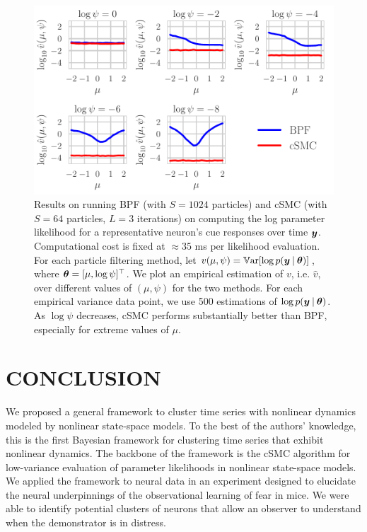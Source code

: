 \documentclass[twoside]{article}
\begin{document}
\begin{figure}[h!]
\begin{center}
\includegraphics[scale=0.5]{../img/bpf-vs-csmc.pdf}
\caption{Results on running BPF (with $S = 1024$ particles) and cSMC (with $S = 64$ particles, $L = 3$ iterations) on computing the log parameter likelihood for a representative neuron's cue responses over time $\boldsymbol{y}$.  Computational cost is fixed at $\approx 35$ ms per likelihood evaluation.  For each particle filtering method, let $v(\mu, \psi) = \mathbb{V}\text{ar}[\log p(\boldsymbol{y} \:\vert\: \boldsymbol{\theta})]$, where $\boldsymbol{\theta} = [\mu, \log \psi]^\top$.  We plot an empirical estimation of $v$, i.e. $\hat{v}$, over different values of $(\mu, \psi)$ for the two methods.  For each empirical variance data point, we use 500 estimations of $\log p(\boldsymbol{y} \:\vert\: \boldsymbol{\theta})$.  As $\log \psi$ decreases, cSMC performs substantially better than BPF, especially for extreme values of $\mu$.} \label{csmc}
\end{center}
\end{figure}


\section{CONCLUSION}
We proposed a general framework to cluster time series with nonlinear dynamics modeled by nonlinear state-space models. To the best of the authors' knowledge, this is the first Bayesian framework for clustering time series that exhibit nonlinear dynamics. The backbone of the framework is the cSMC algorithm for low-variance evaluation of parameter likelihoods in nonlinear state-space models. We applied the framework to neural data in an experiment designed to elucidate the neural underpinnings of the observational learning of fear in mice. {We were able to identify potential clusters of neurons that allow an observer to understand when the demonstrator is in distress.}
\end{document}
